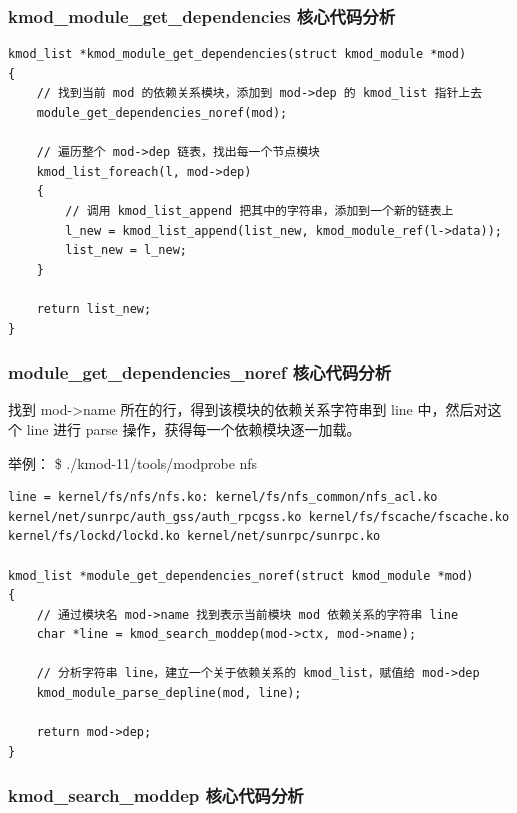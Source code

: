 \subsubsection{kmod\_module\_get\_dependencies 核心代码分析}

{\begin{shaded}\begin{verbatim}
kmod_list *kmod_module_get_dependencies(struct kmod_module *mod)
{
    // 找到当前 mod 的依赖关系模块，添加到 mod->dep 的 kmod_list 指针上去
    module_get_dependencies_noref(mod);

    // 遍历整个 mod->dep 链表，找出每一个节点模块
    kmod_list_foreach(l, mod->dep)
    {
        // 调用 kmod_list_append 把其中的字符串，添加到一个新的链表上
        l_new = kmod_list_append(list_new, kmod_module_ref(l->data));
        list_new = l_new;
    }

    return list_new;
}
\end{verbatim}\end{shaded}}
\subsubsection{module\_get\_dependencies\_noref 核心代码分析}

找到 mod-\textgreater{}name 所在的行，得到该模块的依赖关系字符串到 line
中，然后对这个 line 进行 parse 操作，获得每一个依赖模块逐一加载。

举例： \$ ./kmod-11/tools/modprobe nfs

{\begin{shaded}\begin{verbatim}
line = kernel/fs/nfs/nfs.ko: kernel/fs/nfs_common/nfs_acl.ko kernel/net/sunrpc/auth_gss/auth_rpcgss.ko kernel/fs/fscache/fscache.ko kernel/fs/lockd/lockd.ko kernel/net/sunrpc/sunrpc.ko

kmod_list *module_get_dependencies_noref(struct kmod_module *mod)
{
    // 通过模块名 mod->name 找到表示当前模块 mod 依赖关系的字符串 line
    char *line = kmod_search_moddep(mod->ctx, mod->name);

    // 分析字符串 line，建立一个关于依赖关系的 kmod_list，赋值给 mod->dep
    kmod_module_parse_depline(mod, line);

    return mod->dep;
}
\end{verbatim}\end{shaded}}
\subsubsection{kmod\_search\_moddep 核心代码分析}

